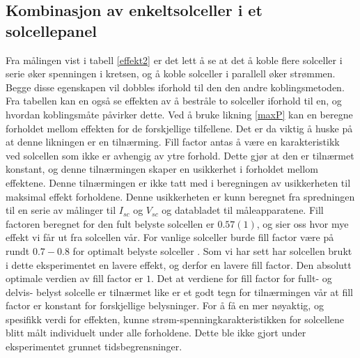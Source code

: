 \documentclass[%
 reprint,
 amsmath,amssymb,
 aps,
 norsk,
 booktabs
]{revtex4-1}
\begin{document}
\subsection{Kombinasjon av enkeltsolceller i et solcellepanel}
Fra målingen vist i tabell \vref{effekt2} er det lett å se at det å koble flere solceller i serie øker spenningen i kretsen, og å koble solceller i parallell øker strømmen. Begge disse egenskapen vil dobbles iforhold til den den andre koblingsmetoden. Fra tabellen kan en også se effekten av å bestråle to solceller iforhold til en, og hvordan koblingsmåte påvirker dette. Ved å bruke likning \eqref{maxP} kan en beregne forholdet mellom effekten for de forskjellige tilfellene. Det er da viktig å huske på at denne likningen er en tilnærming. Fill factor antas å være en karakteristikk ved solcellen som ikke er avhengig av ytre forhold. Dette gjør at den er tilnærmet konstant, og denne tilnærmingen skaper en usikkerhet i forholdet mellom effektene. Denne tilnærmingen er ikke tatt med i beregningen av usikkerheten til maksimal effekt forholdene. Denne usikkerheten er kunn beregnet fra spredningen til en serie av målinger til $I_{sc}$ og $V_{sc}$ og databladet til måleapparatene. Fill factoren beregnet for den fult belyste solcellen er $0.57(1)$, og sier oss hvor mye effekt vi får ut fra solcellen vår. For vanlige solceller burde fill factor være på rundt $0.7-0.8$ for optimalt belyste solceller \cite{energy_alt}. Som vi har sett har solcellen brukt i dette eksperimentet en lavere effekt, og derfor en lavere fill factor. Den absolutt optimale verdien av fill factor er $1$. Det at verdiene for fill factor for fullt- og delvis- belyst solcelle er tilnærmet like er et godt tegn for tilnærmingen vår at fill factor er konstant for forskjellige belysninger. For å få en mer nøyaktig, og spesifikk verdi for effekten, kunne strøm-spenningkarakteristikken for solcellene blitt målt individuelt under alle forholdene. Dette ble ikke gjort under eksperimentet grunnet tidsbegrensninger.\par
\end{document}
